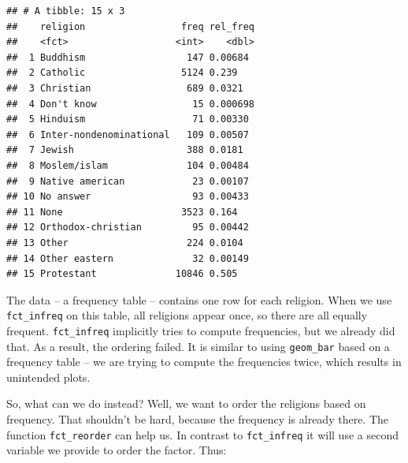 \documentclass[]{tufte-book}
\newenvironment{Shaded}{}{}
\newcommand{\KeywordTok}[1]{\textcolor[rgb]{0.00,0.44,0.13}{\textbf{#1}}}
\newcommand{\DataTypeTok}[1]{\textcolor[rgb]{0.56,0.13,0.00}{#1}}
\newcommand{\StringTok}[1]{\textcolor[rgb]{0.25,0.44,0.63}{#1}}
\newcommand{\OperatorTok}[1]{\textcolor[rgb]{0.40,0.40,0.40}{#1}}
\newcommand{\NormalTok}[1]{#1}
\begin{document}
\begin{verbatim}
## # A tibble: 15 x 3
##    religion                 freq rel_freq
##    <fct>                   <int>    <dbl>
##  1 Buddhism                  147 0.00684 
##  2 Catholic                 5124 0.239   
##  3 Christian                 689 0.0321  
##  4 Don't know                 15 0.000698
##  5 Hinduism                   71 0.00330 
##  6 Inter-nondenominational   109 0.00507 
##  7 Jewish                    388 0.0181  
##  8 Moslem/islam              104 0.00484 
##  9 Native american            23 0.00107 
## 10 No answer                  93 0.00433 
## 11 None                     3523 0.164   
## 12 Orthodox-christian         95 0.00442 
## 13 Other                     224 0.0104  
## 14 Other eastern              32 0.00149 
## 15 Protestant              10846 0.505
\end{verbatim}

The data -- a frequency table -- contains one row for each religion.
When we use \texttt{fct\_infreq} on this table, all religions appear
once, so there are all equally frequent. \texttt{fct\_infreq} implicitly
tries to compute frequencies, but we already did that. As a result, the
ordering failed. It is similar to using \texttt{geom\_bar} based on a
frequency table -- we are trying to compute the frequencies twice, which
results in unintended plots.

So, what can we do instead? Well, we want to order the religions based
on frequency. That shouldn't be hard, because the frequency is already
there. The function \texttt{fct\_reorder} can help us. In contrast to
\texttt{fct\_infreq} it will use a second variable we provide to order
the factor. Thus:

\begin{Shaded}
\end{Shaded}
\end{document}

